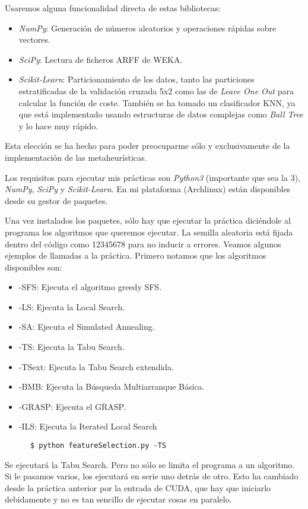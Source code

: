 \documentclass[a4paper, 11pt]{article}
\begin{document}
    Usaremos alguna funcionalidad directa de estas bibliotecas:
    \begin{itemize}
      \item \emph{NumPy}: Generación de números aleatorios y operaciones rápidas sobre vectores.
      \item \emph{SciPy}: Lectura de ficheros ARFF de WEKA.
      \item \emph{Scikit-Learn}: Particionamiento de los datos, tanto las particiones estratificadas de la validación cruzada 5x2 como las de \emph{Leave One Out} para calcular la función de coste. También se ha tomado un clasificador KNN, ya que está implementado usando estructuras de datos complejas como \emph{Ball Tree} y lo hace muy rápido.
    \end{itemize}

    Esta elección se ha hecho para poder preocuparme sólo y exclusivamente de la implementación de las metaheurísticas.

    Los requisitos para ejecutar mis prácticas son \emph{Python3} (importante que sea la 3), \emph{NumPy}, \emph{SciPy} y \emph{Scikit-Learn}. En mi plataforma (Archlinux) están disponibles desde su gestor de paquetes.

    Una vez instalados los paquetes, sólo hay que ejecutar la práctica diciéndole al programa los algoritmos que queremos ejecutar. La semilla aleatoria está fijada dentro del código como 12345678 para no inducir a errores. Veamos algunos ejemplos de llamadas a la práctica. Primero notamos que los algoritmos disponibles son:

    \begin{itemize}
      \item -SFS: Ejecuta el algoritmo greedy SFS.
      \item -LS: Ejecuta la Local Search.
      \item -SA: Ejecuta el Simulated Annealing.
      \item -TS: Ejecuta la Tabu Search.
      \item -TSext: Ejecuta la Tabu Search extendida.
      \item -BMB: Ejecuta la Búsqueda Multiarranque Básica.
      \item -GRASP: Ejecuta el GRASP.
      \item -ILS: Ejecuta la Iterated Local Search
    \end{itemize}

    \begin{verbatim}
      $ python featureSelection.py -TS
    \end{verbatim}
    Se ejecutará la Tabu Search. Pero no sólo se limita el programa a un algoritmo. Si le pasamos varios, los ejecutará en serie uno detrás de otro. Esto ha cambiado desde la práctica anterior por la entrada de CUDA, que hay que iniciarlo debidamente y no es tan sencillo de ejecutar cosas en paralelo.
\end{document}
